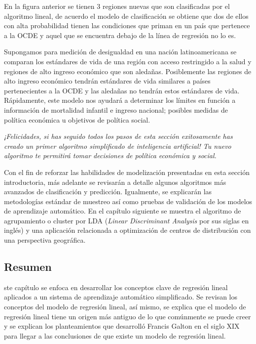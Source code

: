 \documentclass[letterpaper,12pt, spanish, oneside]{book} %
\begin{document}
En la figura anterior se tienen 3 regiones nuevas que son clasificadas por el algoritmo lineal, de acuerdo el modelo de clasificación se obtiene que dos de ellos con alta probabilidad tienen las condiciones que priman en un país que pertenece a la OCDE y aquel que se encuentra debajo de la línea de regresión no lo es. 

Supongamos para medición de desigualdad en una nación latinoamericana se comparan los estándares de vida de una región con acceso restringido a la salud y regiones de alto ingreso económico que son aledañas. Posiblemente las regiones de alto ingreso económico tendrán estándares de vida similares a países pertenecientes a la OCDE y las aledañas no tendrán estos estándares de vida. Rápidamente, este modelo nos ayudará a determinar los límites en función a información de mortalidad infantil e ingreso nacional; posibles medidas de política económica u objetivos de política social.

\textit{¡Felicidades, si has seguido todos los pasos de esta sección exitosamente has creado un primer algoritmo simplificado de inteligencia artificial! Tu nuevo algoritmo te permitirá tomar decisiones de política económica y social.}

Con el fin de reforzar las habilidades de modelización presentadas en esta sección introductoria, más adelante se revisarán a detalle algunos algoritmos más avanzados de clasificación y predicción. Igualmente, se explicarán las metodologías estándar de muestreo así como pruebas de validación de los modelos de aprendizaje automático. En el capítulo siguiente se muestra el algoritmo de agrupamiento o cluster por LDA (\textit{Linear Discriminant Analysis} por sus siglas en inglés) y una aplicación relacionada a optimización de centros de distribución con una perspectiva geográfica.

\subsection{Resumen}

ste capítulo se enfoca en desarrollar los conceptos clave de regresión lineal aplicados a un sistema de aprendizaje automático simplificado. Se revisan los conceptos del modelo de regresión lineal, así mismo, se explica que el modelo de regresión lineal tiene un origen más antiguo de lo que comúnmente se puede creer y se explican los planteamientos que desarrolló Francis Galton en el siglo XIX para llegar a las conclusiones de que existe un modelo de regresión lineal. 
\end{document}
